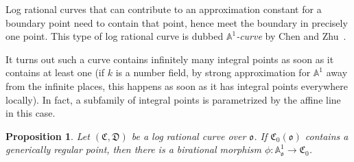 \documentclass[a4paper, twoside, 11pt]{amsart}
\newtheorem{proposition}[theorem]{Proposition}
\theoremstyle{definition}
\newcommand{\mC}{\mathfrak{C}}
\newcommand{\mD}{\mathfrak{D}}
\newcommand{\fo}{\mathfrak{o}}
\newcommand{\dA}{\mathbb{A}}
\begin{document}
Log rational curves that can contribute to an approximation constant for a boundary point need to contain that point, hence meet the boundary in precisely one point. This type of log rational curve is dubbed \emph{$\dA^1$-curve} by Chen and Zhu~\cite[Def.~1.11]{Chen-Zhu}.

It turns out such a curve contains infinitely many integral points as soon as it contains at least one (if $k$ is a number field, by strong approximation for $\dA^1$ away from the infinite places, this happens as soon as it has integral points everywhere locally). In fact, a subfamily of integral points is parametrized by the affine line in this case.

\begin{proposition}\label{prop:a1para}
	Let $(\mC,\mD)$ be a log rational curve over $\fo$.
	If $\mC_0(\fo)$ contains a generically regular point, then there is a birational morphism $\phi\colon \dA_{\fo}^1\to \mC_0$.
\end{proposition}
\end{document}
